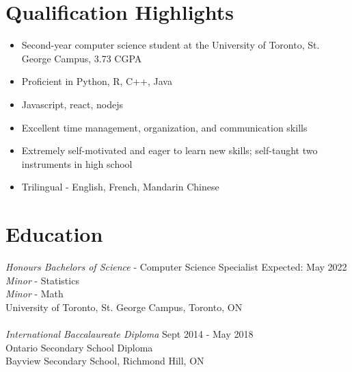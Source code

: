 \documentclass[letter]{res}
\begin{document}
\address{ (647)-968-0036 \\}
\address{
    \texttt{zenghao.wang@mail.utoronto.ca}\\
    \texttt{github.com/ZenghaoWang}
}
\begin{resume}
    \noindent\makebox[\linewidth]{\rule{\paperwidth}{0.4pt}}

    \section{Qualification Highlights}
    \begin{itemize}
        \item Second-year computer science student at the University of Toronto, St. George Campus, 3.73 CGPA
        \item Proficient in Python, R, C++, Java
        \item Javascript, react, nodejs
        \item Excellent time management, organization, and communication skills
        \item Extremely self-motivated and eager to learn new skills; self-taught two instruments in high school
        \item Trilingual - English, French, Mandarin Chinese
    \end{itemize}
    \section{Education}
     {\sl Honours Bachelors of Science} - Computer Science Specialist \hfill Expected: May 2022\\
    {\sl Minor} - Statistics \\
    {\sl Minor} - Math \\
    University of Toronto, St. George Campus,  Toronto, ON \\
    \\
    {\sl International Baccalaureate Diploma}  \hfill Sept 2014 - May 2018\\
    Ontario Secondary School Diploma \\
    Bayview Secondary School,  Richmond Hill, ON
    \vspace{-2mm}


\end{resume}
\end{document}
